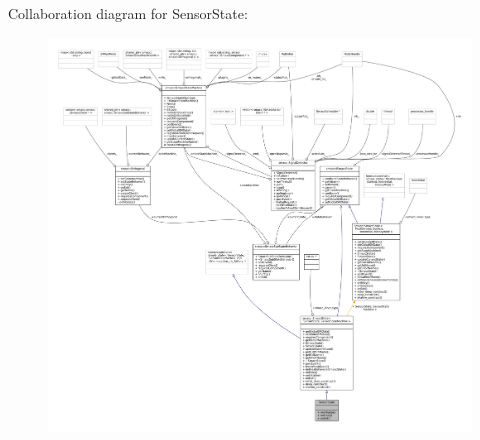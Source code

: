 Collaboration diagram for Sensor\+State\+:
\nopagebreak
\begin{figure}[H]
\begin{center}
\leavevmode
\includegraphics[width=350pt]{structSensorState__coll__graph}
\end{center}
\end{figure}
